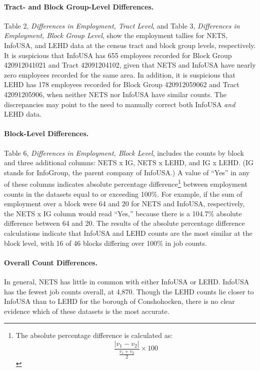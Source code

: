 \documentclass[paper = letter, fontsize = 11pt]{scrartcl}
\begin{document}
\paragraph{Tract- and Block Group-Level Differences.} Table 2, \textit{Differences in Employment, Tract Level}, and Table 3, \textit{Differences in Employment, Block Group Level}, show the employment tallies for NETS, InfoUSA, and LEHD data at the census tract and block group levels, respectively. It is suspicious that InfoUSA has 655 employees recorded for Block Group 420912041021 and Tract 42091204102, given that NETS and InfoUSA have nearly zero employees recorded for the same area. In addition, it is suspicious that LEHD has 178 employees recorded for Block Group 420912059062 and Tract 42091205906, when neither NETS nor InfoUSA have similar counts. The discrepancies may point to the need to manually correct both InfoUSA \textit{and} LEHD data.
\paragraph{Block-Level Differences.} Table 6, \textit{Differences in Employment, Block Level}, includes the counts by block and three additional columns: NETS x IG, NETS x LEHD, and IG x LEHD. (IG stands for InfoGroup, the parent company of InfoUSA.) A value of ``Yes'' in any of these columns indicates absolute percentage difference\footnote{The absolute percentage difference is calculated as: \[ \frac{\lvert v_{1} - v_{2} \rvert}{\frac{v_{1} + v_{2}}{2}} \times 100 \]} between employment counts in the datasets equal to or exceeding 100\%. For example, if the sum of employment over a block were 64 and 20 for NETS and InfoUSA, respectively, the NETS x IG column would read ``Yes,'' because there is a 104.7\% absolute difference between 64 and 20. The results of the absolute percentage difference calculations indicate that InfoUSA and LEHD counts are the most similar at the block level, with 16 of 46 blocks differing over 100\% in job counts.
\paragraph{Overall Count Differences.} In general, NETS has little in common with either InfoUSA or LEHD. InfoUSA has the fewest job counts overall, at 4,870. Though the LEHD counts lie closer to InfoUSA than to LEHD for the borough of Conshohocken, there is no clear evidence which of these datasets is the most accurate.
\end{document}
